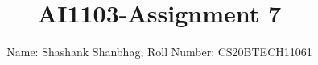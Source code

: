 \documentclass[journal,12pt,twocolumn]{IEEEtran}
\DeclareMathOperator*{\Res}{Res}
\begin{document}
\newcommand{\BEQA}{\begin{eqnarray}}
\newcommand{\EEQA}{\end{eqnarray}}
\newcommand{\define}{\stackrel{\triangle}{=}}

\raggedbottom
\setlength{\parindent}{0pt}
\providecommand{\mbf}{\mathbf}
\providecommand{\pr}[1]{\ensuremath{\Pr\left(#1\right)}}
\providecommand{\qfunc}[1]{\ensuremath{Q\left(#1\right)}}
\providecommand{\sbrak}[1]{\ensuremath{{}\left[#1\right]}}
\providecommand{\lsbrak}[1]{\ensuremath{{}\left[#1\right.}}
\providecommand{\rsbrak}[1]{\ensuremath{{}\left.#1\right]}}
\providecommand{\brak}[1]{\ensuremath{\left(#1\right)}}
\providecommand{\lbrak}[1]{\ensuremath{\left(#1\right.}}
\providecommand{\rbrak}[1]{\ensuremath{\left.#1\right)}}
\providecommand{\cbrak}[1]{\ensuremath{\left\{#1\right\}}}
\providecommand{\lcbrak}[1]{\ensuremath{\left\{#1\right.}}
\providecommand{\rcbrak}[1]{\ensuremath{\left.#1\right\}}}
\theoremstyle{remark}
\newtheorem{rem}{Remark}
\newcommand{\sgn}{\mathop{\mathrm{sgn}}}
\providecommand{\abs}[1]{\vert#1\vert}
\providecommand{\res}[1]{\Res\displaylimits_{#1}} 
\providecommand{\norm}[1]{\lVert#1\rVert}
\providecommand{\mtx}[1]{\mathbf{#1}}
\providecommand{\mean}[1]{E[ #1 ]}
\providecommand{\fourier}{\overset{\mathcal{F}}{ \rightleftharpoons}}
\providecommand{\system}{\overset{\mathcal{H}}{ \longleftrightarrow}}
\newcommand{\solution}{\noindent \textbf{Solution: }}
\newcommand{\cosec}{\,\text{cosec}\,}
\providecommand{\dec}[2]{\ensuremath{\overset{#1}{\underset{#2}{\gtrless}}}}
\newcommand{\myvec}[1]{\ensuremath{\begin{pmatrix}#1\end{pmatrix}}}
\newcommand{\mydet}[1]{\ensuremath{\begin{vmatrix}#1\end{vmatrix}}}
\makeatletter
{}
\makeatother
\let\StandardTheFigure\thefigure
\let\vec\mathbf
\renewcommand{\thefigure}{\theproblem}
\def\putbox#1#2#3{\makebox[0in][l]{\makebox[#1][l]{}\raisebox{\baselineskip}[0in][0in]{\raisebox{#2}[0in][0in]{#3}}}}
     \def\rightbox#1{\makebox[0in][r]{#1}}
     \def\centbox#1{\makebox[0in]{#1}}
     \def\topbox#1{\raisebox{-\baselineskip}[0in][0in]{#1}}
     \def\midbox#1{\raisebox{-0.5\baselineskip}[0in][0in]{#1}}
\vspace{3cm}
\title{\textbf{AI1103-Assignment 7}}
\author{Name: Shashank Shanbhag, Roll Number: CS20BTECH11061 }
\maketitle
\newpage
\bigskip
\renewcommand{\thefigure}{\theenumi}
\renewcommand{\thetable}{\theenumi}
\end{document}

